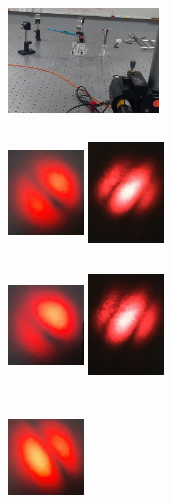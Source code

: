 \documentclass[12pt]{book}
\begin{document}
\begin{figure}[t!]
\centering
\begin{subfigure}[b]{0.3\linewidth}
\centering
\includegraphics[width=4cm,height=3cm]{images/array1.jpg}
\caption{}
\end{subfigure}
\begin{subfigure}[b]{0.3\linewidth}
\centering
\includegraphics[width=2cm,height=3cm]{images/fotos/11.jpg}
\includegraphics[width=2cm,height=3cm]{images/fotos/112.jpg}
\caption{}
\end{subfigure}
\begin{subfigure}[b]{0.3\linewidth}
\centering
\includegraphics[width=2cm,height=3cm]{images/fotos/21.jpg}
\includegraphics[width=2cm,height=3cm]{images/fotos/102.jpg}
\caption{}
\end{subfigure}
\begin{subfigure}[b]{0.3\linewidth}
\centering
\includegraphics[width=2cm,height=3cm]{images/fotos/31.jpg}

\end{subfigure}
\end{figure}
\end{document}
